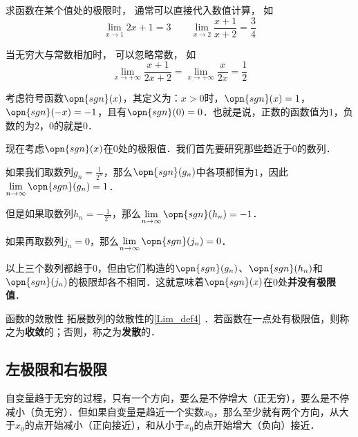 
\begin{example}{}
求函数在某个值处的极限时， 通常可以直接代入数值计算， 如
\begin{equation}
\lim_{x\to 1} 2x + 1 = 3 \qquad \lim_{x\to 2}\frac{x + 1}{x + 2} = \frac34
\end{equation}

当无穷大与常数相加时， 可以忽略常数， 如
\begin{equation}
\lim_{x\to +\infty} \frac{x + 1}{2x + 2} = \lim_{x\to +\infty} \frac{x}{2x} = \frac12
\end{equation}
\end{example}

\begin{example}{}\label{Lim_ex2}
考虑符号函数$\opn{sgn}(x)$，其定义为：$x>0$时，$\opn{sgn}(x)=1$，$\opn{sgn}(-x)=-1$，且有$\opn{sgn}(0)=0$．也就是说，正数的函数值为$1$，负数的为$2$，$0$的就是$0$．

现在考虑$\opn{sgn}(x)$在$0$处的极限值．我们首先要研究那些趋近于$0$的数列．

如果我们取数列$g_n=\frac{1}{2^n}$，那么$\opn{sgn}(g_n)$中各项都恒为$1$，因此$\lim\limits_{n\to\infty}\opn{sgn}(g_n)=1$．

但是如果取数列$h_n=-\frac{1}{2^n}$，那么$\lim\limits_{n\to\infty}\opn{sgn}(h_n)=-1$．

如果再取数列$j_n=0$，那么$\lim\limits_{n\to\infty}\opn{sgn}(j_n)=0$．

以上三个数列都趋于$0$，但由它们构造的$\opn{sgn}(g_n)$、$\opn{sgn}(h_n)$和$\opn{sgn}(j_n)$的极限却各不相同．这就意味着$\opn{sgn}(x)$在$0$处\textbf{并没有极限值}．
\end{example}

\begin{definition}{函数的敛散性}
拓展数列的敛散性的\autoref{Lim_def4} ．若函数在一点处有极限值，则称之为\textbf{收敛}的；否则，称之为\textbf{发散}的．
\end{definition}

\subsection{左极限和右极限}

自变量趋于无穷的过程，只有一个方向，要么是不停增大（正无穷），要么是不停减小（负无穷）．但如果自变量是趋近一个实数$x_0$，那么至少就有两个方向，从大于$x_0$的点开始减小（正向接近），和从小于$x_0$的点开始增大（负向）接近．

